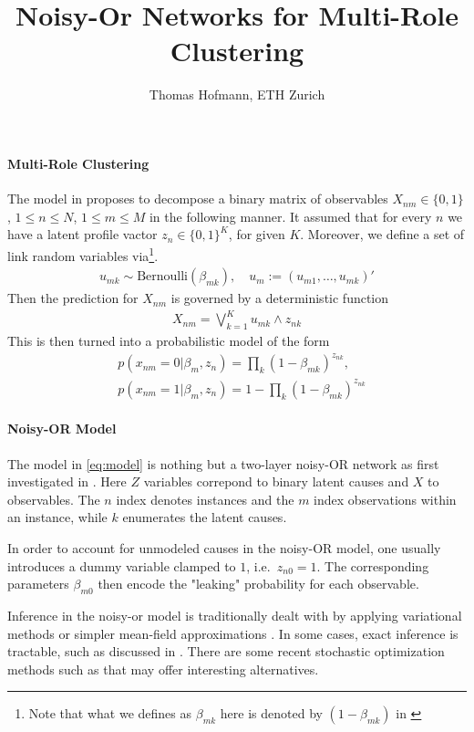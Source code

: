 \documentclass{article}
\title{Noisy-Or Networks for Multi-Role Clustering}
\author{Thomas Hofmann, ETH Zurich}
\begin{document}
\maketitle 

\paragraph*{Multi-Role Clustering}
The model in \cite{frank2013role} proposes to decompose a binary matrix of observables $X_{nm} \in \{0,1\}$, $1 \le n \le N$, $1\le m\le M$ in the following manner. It assumed that for every $n$ we have a latent profile vactor $z_n \in \{0,1\}^K$, for given $K$. Moreover, we define a set of link random variables via\footnote{Note that what we defines as $\beta_{mk}$ here is denoted by $(1-\beta_{mk})$ in \cite{frank2013role}}. 
\begin{align}
u_{mk} \sim \text{Bernoulli}(\beta_{mk}), \quad u_m:= (u_{m1},\dots,u_{mk})'
\end{align}
Then the prediction for $X_{nm}$ is governed by a deterministic function
\begin{align}
X_{nm} = \bigvee_{k=1}^K u_{mk} \wedge  z_{nk}
\end{align}
This is then turned into a probabilistic model of the form 
\begin{align}
\label{eq:model}
& p(x_{nm} =0 | \beta_m ,z_n) = \prod_{k} (1-\beta_{mk})^{z_{nk}} , \\
& p(x_{nm}=1 | \beta_m,z_n)  = 1-  \prod_{k} (1-\beta_{mk})^{z_{nk}}
\end{align}

\paragraph*{Noisy-OR Model}

The model in \eqref{eq:model} is nothing but a two-layer noisy-OR network as first investigated in \cite{shwe1991probabilistic,jaakkola1999variational,ng1999approximate,vsingliar2006noisy}. Here $Z$ variables correpond to binary latent causes and $X$ to observables. The $n$ index denotes instances and the $m$ index observations within an instance, while $k$ enumerates the latent causes.  

In order to account for unmodeled causes in the noisy-OR model, one usually introduces a dummy variable clamped to  $1$, i.e.~$z_{n0}=1$. The corresponding parameters $\beta_{m0}$ then encode the "leaking" probability for each observable. 

Inference in the noisy-or model is traditionally dealt with by applying variational methods \cite{jaakkola1999variational,vsingliar2006noisy} or simpler mean-field approximations \cite{ng1999approximate,platt2007fast}. In some cases, exact inference is tractable, such as discussed in \cite{halpern2013unsupervised} . There are some recent stochastic optimization methods such as \cite{salimans2013fixed} that may offer interesting alternatives. 




\end{document}
